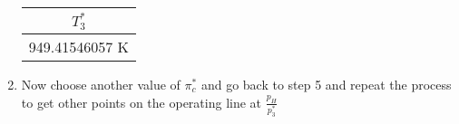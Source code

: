 \documentclass[titlepage]{article}
\begin{document}
\begin{enumerate}
  \begin{center}
    \begin{tabular}{|c|}
      \hline
      $T_{3}^{*}$ \\
      \hline
      949.41546057 K \\
      \hline
    \end{tabular}
  \end{center}

\item Now choose another value of $\pi_{c}^{*}$ and go back to step 5 and repeat the process to get other points on the operating line at $\frac{p_{H}}{p_{3}^{*}}$ 


\end{enumerate}
\end{document}
